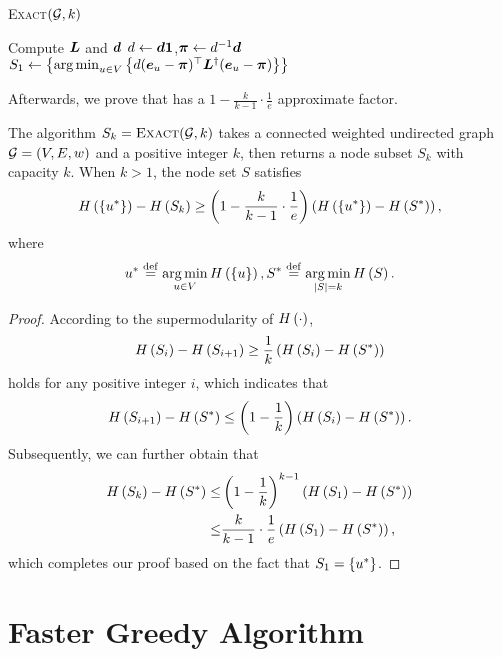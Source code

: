 \documentclass[sigconf]{acmart}
\begin{document}
\begin{algorithm}
  \caption{\textsc{Exact}\((\mathcal{G},k)\)}
  \label{algo:exact}
  Compute \(\boldsymbol{L}\) and \(\boldsymbol{d}\)\;
  \(d\gets\boldsymbol{d}\boldsymbol{1}\),\(\boldsymbol{\pi}\gets d^{-1}\boldsymbol{d}\)\;
  \(S_1\gets\left\{\operatorname*{arg\,min}_{u\in V}\left\{d(\boldsymbol{e}_u-\boldsymbol{\pi})^\top\boldsymbol{L}^\dagger(\boldsymbol{e}_u-\boldsymbol{\pi}) \right\} \right\}\)\;
\end{algorithm}

Afterwards, we prove that  has a \(1-\frac{k}{k-1}\cdot\frac{1}{e}\) approximate factor.
\begin{theorem}
  The algorithm \(S_k=\textsc{Exact}(\mathcal{G},k)\) takes a connected weighted undirected graph \(\mathcal{G}=(V,E,w)\) and a positive integer \(k\), then returns a node subset \(S_k\) with capacity \(k\).
  When \(k>1\), the node set \(S\) satisfies
  \[H\left(\left\{u^* \right\}\right)-H\left(S_k\right)\ge\left( 1-\frac{k}{k-1}\cdot\frac{1}{e} \right)\left( H\left(\left\{u^* \right\}\right)-H\left(S^*\right) \right),\]
  where
  \[u^*\stackrel{\mathrm{def}}{=}\operatorname*{arg\,min}_{u\in V}H\left(\left\{u \right\}\right),S^*\stackrel{\mathrm{def}}{=}\operatorname*{arg\,min}_{\left|S \right|=k}H\left(S\right).\]
\end{theorem}
\begin{proof}
  According to the supermodularity of \(H\left(\cdot\right)\),
  \[H\left(S_i\right)-H\left(S_{i+1}\right)\ge\frac{1}{k}\left( H\left(S_i\right)-H\left(S^*\right) \right)\]
  holds for any positive integer \(i\), which indicates that
  \[H\left(S_{i+1}\right)-H\left(S^*\right)\le\left( 1-\frac{1}{k} \right)\left( H\left(S_i\right)-H\left(S^*\right) \right).\]
  Subsequently, we can further obtain that
  \begin{align*}
    H\left(S_k\right)-H\left(S^*\right)\le & \left( 1-\frac{1}{k} \right)^{k-1}\left( H\left(S_1\right)-H\left(S^*\right) \right)    \\
    \le                      & \frac{k}{k-1}\cdot\frac{1}{e}\left( H\left(S_1\right)-H\left(S^*\right) \right),
  \end{align*}
  which completes our proof based on the fact that \(S_1=\left\{u^* \right\}\).
\end{proof}

\section{Faster Greedy Algorithm}\label{sec:faster-greedy}
\end{document}
